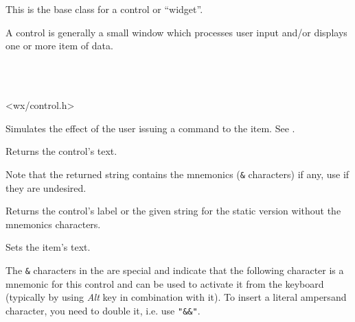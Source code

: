 \section{}\label{wxcontrol}

This is the base class for a control or ``widget''.

A control is generally a small window which processes user input and/or
displays one or more item of data.


\\
\\


<wx/control.h>







\label{wxcontrolcommand}


Simulates the effect of the user issuing a command to the item. See .


\label{wxcontrolgetlabel}


Returns the control's text.

Note that the returned string contains the mnemonics (\texttt{\&} characters) if
any, use  if they are
undesired.


\label{wxcontrolgetlabeltext}



Returns the control's label or the given  string for the static
version without the mnemonics characters.


\label{wxcontrolsetlabel}


Sets the item's text.

The \texttt{\&} characters in the  are special and indicate that the
following character is a mnemonic for this control and can be used to activate
it from the keyboard (typically by using \textit{Alt} key in combination with
it). To insert a literal ampersand character, you need to double it, i.e. use 
\texttt{"\&\&"}.


